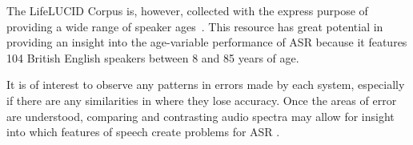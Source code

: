 The LifeLUCID Corpus is, however, collected with the express purpose of providing a wide range of
speaker ages~\cite{lifelucid}.
This resource has great potential in providing an insight into the age-variable performance of
ASR because it features 104 British English speakers between 8 and 85 years of age.

It is of interest to observe any patterns in errors made by each system, especially if there are
any similarities in where they lose accuracy.
Once the areas of error are understood, comparing and contrasting audio spectra may allow for
insight into which features of speech create problems for ASR .

